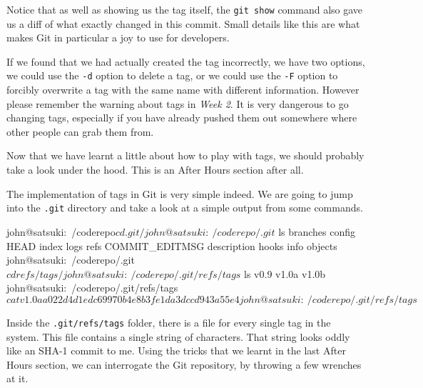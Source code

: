 Notice that as well as showing us the tag itself, the \texttt{git show} command also gave us a diff of what exactly changed in this commit.
Small details like this are what makes Git in particular a joy to use for developers.

If we found that we had actually created the tag incorrectly, we have two options, we could use the \texttt{-d} option to delete a tag, or we could use the \texttt{-F} option to forcibly overwrite a tag with the same name with different information.
However please remember the warning about tags in \emph{Week 2}.
It is very dangerous to go changing tags, especially if you have already pushed them out somewhere where other people can grab them from.

Now that we have learnt a little about how to play with tags, we should probably take a look under the hood.
This is an After Hours section after all.

The implementation of tags in Git is very simple indeed.
We are going to jump into the \texttt{.git} directory and take a look at a simple output from some commands.

\begin{code}
john@satsuki:~/coderepo$ cd .git/
john@satsuki:~/coderepo/.git$ ls
branches        config       HEAD   index  logs     refs
COMMIT_EDITMSG  description  hooks  info   objects
john@satsuki:~/coderepo/.git$ cd refs/tags/
john@satsuki:~/coderepo/.git/refs/tags$ ls
v0.9  v1.0a  v1.0b
john@satsuki:~/coderepo/.git/refs/tags$ cat v1.0a
a022d4d1edc69970b4e8b3fe1da3dccd943a55e4
john@satsuki:~/coderepo/.git/refs/tags$
\end{code}

Inside the \texttt{.git/refs/tags} folder, there is a file for every single tag in the system.
This file contains a single string of characters.
That string looks oddly like an SHA-1 commit to me.
Using the tricks that we learnt in the last After Hours section, we can interrogate the Git repository, by throwing a few wrenches at it.


